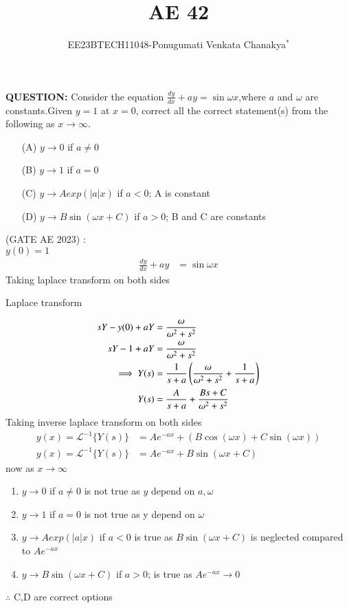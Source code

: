 \documentclass[journal,12pt,twocolumn]{IEEEtran}
\theoremstyle{remark}
\begin{document}
 
 \vspace{3cm}
 \title{\textbf{AE 42}}
 \author{EE23BTECH11048-Ponugumati Venkata Chanakya$^{*}$%
 }
 \maketitle
 \newpage
 \bigskip
 \renewcommand{\thefigure}{\theenumi}
 \renewcommand{\thetable}{\theenumi}
 \textbf{QUESTION:}
Consider the equation $\frac{dy}{dx}+ay=\sin{\omega x}$,where $a$ and $\omega$ are constants.Given $y=1$ at $x=0$, correct all the correct statement(s) from the following as $x\to \infty$.
\begin{enumerate}
  \item[(A)]  $y \to 0$ if $a \neq 0$ \\ 
  \item[(B)]  $y \to 1$ if $a = 0$\\
  \item[(C)]  $y \to Aexp(|a|x)$ if $a < 0$; A is constant\\
  \item[(D)]  $y \to B \sin(\omega x+C)$ if $a>0$; B and C are constants\\
\end{enumerate}
 \hfill(GATE AE 2023)
\solution: \\
  $y(0)=1$
\begin{align}
 \frac{dy}{dx}+ay &= \sin{\omega x}
\end{align}
 Taking laplace transform on both sides 
  \begin{table}[!ht]
    \centering
        
    \caption{Laplace transform}
    \label{tab:Gate AE 42 }
\end{table}
\begin{align}
    sY-y(0)+aY &= \frac{\omega}{\omega^2+s^2}\\
    sY-1+aY &= \frac{\omega}{\omega^2+s^2}\\
    \implies Y(s)&=\frac{1}{s+a} \left(\frac{\omega}{\omega^2+s^2}+\frac{1}{s+a}\right)\\
     Y(s)&=\frac{A}{s+a} +\frac{Bs+C}{\omega^2+s^2}
 \end{align}
 Taking inverse laplace transform on both sides 
 \begin{align}
      y(x) = \mathcal{L}^{-1}\{Y(s)\} &= A e^{-ax} + (B\cos(\omega x) + C\sin(\omega x))\\
       y(x) = \mathcal{L}^{-1}\{Y(s)\} &= A e^{-ax} + B\sin(\omega x+C)
 \end{align}
 now as $x\to \infty$
 \begin{enumerate}
     \item $y \to 0$ if $a \neq 0$ is not true as $y$ depend on $a,\omega$
     \item $y \to 1 $ if $ a=0$ is not true as y depend on $\omega$
     \item $y \to Aexp(|a|x)$ if $a < 0$ is true as $ B\sin(\omega x+C)$ is neglected compared to $A e^{-ax}$
     \item $y \to B \sin(\omega x+C)$ if $a>0$; is true as $A e^{-ax} \to 0$ 
     
 \end{enumerate}
  $\therefore$ C,D are correct options
 
\end{document}
